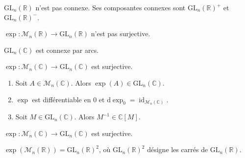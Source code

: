 	\begin{proposition}
		$\mathrm{GL}_n(\mathbb{R})$ n'est pas connexe. Ses composantes connexes sont $\mathrm{GL}_n(\mathbb{R})^+$ et $\mathrm{GL}_n(\mathbb{R})^-$.
	\end{proposition}

	\begin{application}
		$\exp : \mathcal{M}_n(\mathbb{R}) \rightarrow \mathrm{GL}_n(\mathbb{R})$ n'est pas surjective.
	\end{application}


	\begin{proposition}
		$\mathrm{GL}_n(\mathbb{C})$ est connexe par arcs.
	\end{proposition}

	\begin{application}
		$\exp : \mathcal{M}_n(\mathbb{C}) \rightarrow \mathrm{GL}_n(\mathbb{C})$ est surjective.
	\end{application}


    \begin{lemma}
      \begin{enumerate}[label=(\roman*)]
        \item Soit $A \in \mathcal{M}_n(\mathbb{C})$. Alors $\exp(A) \in \mathrm{GL}_n(\mathbb{C})$.
        \item $\exp$ est différentiable en $0$ et $\mathrm{d}\exp_0 = \operatorname{id}_{\mathcal{M}_n(\mathbb{C})}$.
        \item Soit $M \in \mathrm{GL}_n(\mathbb{C})$. Alors $M^{-1} \in \mathbb{C}[M]$.
      \end{enumerate}
    \end{lemma}


    \begin{theorem}
      $\exp : \mathcal{M}_n(\mathbb{C}) \rightarrow \mathrm{GL}_n(\mathbb{C})$ est surjective.
    \end{theorem}

    \begin{application}
      $\exp(\mathcal{M}_n(\mathbb{R})) = \mathrm{GL}_n(\mathbb{R})^2$, où $\mathrm{GL}_n(\mathbb{R})^2$ désigne les carrés de $\mathrm{GL}_n(\mathbb{R})$.
    \end{application}

